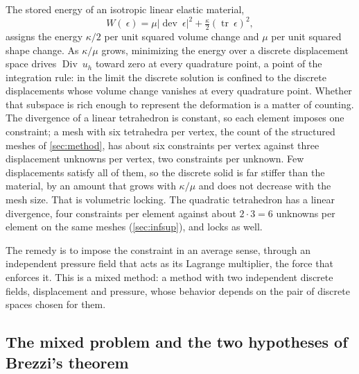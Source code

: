\documentclass{article}
\newcommand{\eps}{~\epsilon}
\newcommand{\Div}{\operatorname{Div}}
\newcommand{\dev}{\operatorname{dev}}
\newcommand{\trace}{\operatorname{tr}}
\theoremstyle{definition}
\theoremstyle{plain}
\begin{document}
The stored energy of an isotropic linear elastic material,
\begin{equation}
  \label{eq:smallenergy}
  W(\eps) = \mu \lvert \dev\eps \rvert^2 + \tfrac{\kappa}{2} (\trace\eps)^2 ,
\end{equation}
assigns the energy $\kappa/2$ per unit squared volume change and $\mu$ per
unit squared shape change. As $\kappa/\mu$ grows, minimizing the energy over
a discrete displacement space drives $\Div ~u_h$ toward zero at every
quadrature point, a point of the integration rule: in the limit the
discrete solution is confined to the discrete displacements whose volume
change vanishes at every quadrature point. Whether that subspace is rich
enough to represent the deformation is a matter of counting. The divergence
of a linear tetrahedron is constant, so each element imposes one constraint;
a mesh with six tetrahedra per vertex, the count of the structured meshes of
\cref{sec:method}, has about six constraints per vertex against three
displacement unknowns per vertex, two constraints per unknown. Few
displacements satisfy all of them, so the discrete solid is far stiffer than
the material, by an amount that grows with $\kappa/\mu$ and does not
decrease with the mesh size. That is volumetric locking. The quadratic
tetrahedron has a linear divergence, four constraints per element against
about $2 \cdot 3 = 6$ unknowns per element on the same meshes
(\cref{sec:infsup}), and locks as well.

The remedy is to impose the constraint in an average sense, through an
independent pressure field that acts as its Lagrange multiplier, the
force that enforces it. This is a mixed method: a method with two
independent discrete fields, displacement and pressure, whose behavior
depends on the pair of discrete spaces chosen for them.

\subsection{The mixed problem and the two hypotheses of Brezzi's theorem}
\label{sec:mixed}
\end{document}
